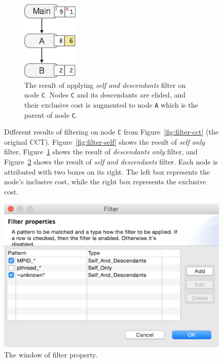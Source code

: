 \begin{figure}
\begin{subfigure}{.45\textwidth}
    \label{fig:filter-children}
  \end{subfigure}%
  \qquad
  \begin{subfigure}{.45\textwidth}
    \centering
    \includegraphics[scale=.8]{fig/hpcviewer-filter-self_children.png}
    \caption{The result of applying \emph{self and descendants} filter on node \texttt{C}. %
Nodes \texttt{C} and its descendants are elided, and their exclusive cost is augmented to node \texttt{A} which is the parent of node \texttt{C}.}
    \label{fig:filter-selfchildren}
  \end{subfigure}

  \caption{Different results of filtering on node \texttt{C} from Figure~\ref{fig:filter-cct} (the original CCT). Figure~\ref{fig:filter-self} shows the result of \emph{self only} filter,
	   Figure~\ref{fig:filter-children} shows the result of \emph{descendants only} filter, and Figure~\ref{fig:filter-selfchildren} shows the result of \emph{self and descendants} filter.
 Each node is attributed with two boxes on its right.  The left box represents the node's inclusive cost, while the right box represents the exclusive cost.}
  \label{fig:filter}
\end{figure}
\begin{figure}
 \centering
 \includegraphics{fig/hpcviewer-filter-window.png}
 \caption{The window of filter property.}
 \label{fig:filter-window}
\end{figure}

